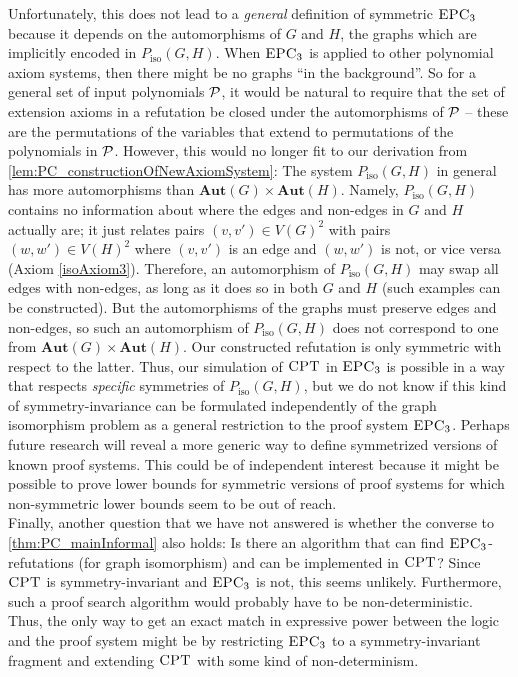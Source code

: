 \documentclass[10pt,a4paper]{article}
\newcommand{\CPT}{\mbox{\sc CPT}}
\newcommand{\Aut}{\mathbf{Aut}}
\newcommand{\EPC}{\mbox{\sc EPC}}
\newcommand{\Pp}{{\cal P}}
\newcommand{\Piso}{P_{\text{iso}}}
\begin{document}
	Unfortunately, this does not lead to a \emph{general} definition of symmetric $\EPC_3$ because it depends on the automorphisms of $G$ and $H$, the graphs which are implicitly encoded in $\Piso(G,H)$. When $\EPC_3$ is applied to other polynomial axiom systems, then there might be no graphs ``in the background''. So for a general set of input polynomials $\Pp$, it would be natural to require that the set of extension axioms in a refutation be closed under the automorphisms of $\Pp$ -- these are the permutations of the variables that extend to permutations of the polynomials in $\Pp$. However, this would no longer fit to our derivation from \autoref{lem:PC_constructionOfNewAxiomSystem}: The system $\Piso(G,H)$ in general has more automorphisms than $\Aut(G) \times \Aut(H)$. Namely, $\Piso(G,H)$ contains no information about where the edges and non-edges in $G$ and $H$ actually are; it just relates pairs $(v,v') \in V(G)^2$ with pairs $(w,w') \in V(H)^2$ where $(v,v')$ is an edge and $(w,w')$ is not, or vice versa (Axiom \eqref{isoAxiom3}). Therefore, an automorphism of $\Piso(G,H)$ may swap all edges with non-edges, as long as it does so in both $G$ and $H$ (such examples can be constructed). But the automorphisms of the graphs must preserve edges and non-edges, so such an automorphism of $\Piso(G,H)$ does not correspond to one from $\Aut(G) \times \Aut(H)$. Our constructed refutation is only symmetric with respect to the latter. Thus, our simulation of $\CPT$ in $\EPC_3$ is possible in a way that respects \emph{specific} symmetries of $\Piso(G,H)$, but we do not know if this kind of symmetry-invariance can be formulated independently of the graph isomorphism problem as a general restriction to the proof system $\EPC_3$. Perhaps future research will reveal a more generic way to define symmetrized versions of known proof systems. This could be of independent interest because it might be possible to prove lower bounds for symmetric versions of proof systems for which non-symmetric lower bounds seem to be out of reach.\\
	
	Finally, another question that we have not answered is whether the converse to \autoref{thm:PC_mainInformal} also holds: Is there an algorithm that can find $\EPC_3$-refutations (for graph isomorphism) and can be implemented in $\CPT$? Since $\CPT$ is symmetry-invariant and $\EPC_3$ is not, this seems unlikely. Furthermore, such a proof search algorithm would probably have to be non-deterministic. Thus, the only way to get an exact match in expressive power between the logic and the proof system might be by restricting $\EPC_3$ to a symmetry-invariant fragment and extending $\CPT$ with some kind of non-determinism.
	
\end{document}
